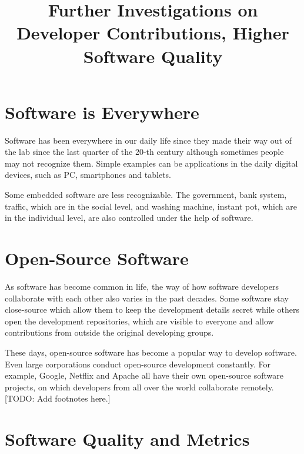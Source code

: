 \documentclass[10pt,conference]{IEEEtran}
\newcommand{\comment}[1]{{\leavevmode\color{comment}[TODO: #1]}\xspace}
\begin{document}
\title{Further Investigations on Developer Contributions, Higher Software Quality}

\author{
}


\maketitle

\section{Software is Everywhere}

Software has been everywhere in our daily life since they made their way out of the lab since the last quarter of the 20-th century although sometimes people may not recognize them.
Simple examples can be applications in the daily digital devices, such as PC, smartphones and tablets. 

Some embedded software are less recognizable. 
The government, bank system, traffic, which are in the social level, and washing machine, instant pot, which are in the individual level, are also controlled under the help of software.

\section{Open-Source Software}
As software has become common in life, the way of how software developers collaborate with each other also varies in the past decades.
Some software stay close-source which allow them to keep the development details secret while others open the development repositories, which are visible to everyone and allow contributions from outside the original developing groups.

These days, open-source software has become a popular way to develop software. Even large corporations conduct open-source development constantly.
For example, Google, Netflix and Apache all have their own open-source software projects, on which developers from all over the world collaborate remotely. \comment{Add footnotes here.}

\section{Software Quality and Metrics}
\end{document}
